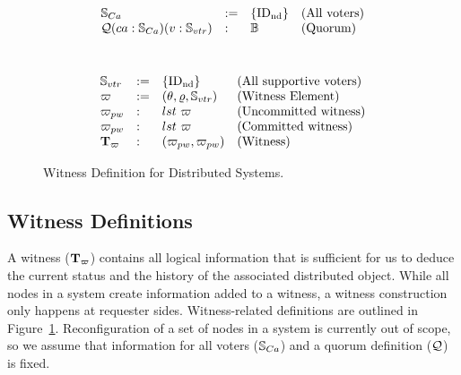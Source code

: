 \begin{figure}
\raggedright
\noindent{}  \\
$$
\begin{array}{llll}
\mathbb{S}_{Ca} & := & \{\mathrm{ID_{nd}}\} & \mbox{(All voters)}\\
\mathcal{Q} (ca: \mathbb{S}_{Ca}) (v: \mathbb{S}_{vtr}) &:& \mathbb{B} & \mbox{(Quorum)} \\
\end{array}
$$
\raggedright
\noindent{}  \\
$$
\begin{array}{llll}
\mathbb{S}_{vtr} & := & \{\mathrm{ID_{nd}}\} & \mbox{(All supportive voters)}\\
\varpi & :=  & ( \theta, \varrho, \mathbb{S}_{vtr}) & \mbox{(Witness Element)}\\
{\varpi_{pw}} &: & lst \ \varpi   & \mbox{(Uncommitted witness)}\\
{\varpi_{pw}} &: & lst \ \varpi   & \mbox{(Committed witness)}\\
{\textbf{T}_{\varpi}} &: &  ({\varpi_{pw}} , {\varpi_{pw}}) & \mbox{(Witness)}\\
\end{array}
$$
\caption{Witness Definition for Distributed Systems.}
\label{fig:chapter:witnesspassing:witness-definition}
\end{figure}

\subsection{Witness Definitions} 
\label{chapte:witnesspassing:subsec:witness-definition}

A witness (${\textbf{T}_{\varpi}}$) contains all logical information that is sufficient for us to deduce the current status and the history of the associated distributed object. 
While all nodes in a system create information added to a witness, a witness construction only
happens at requester sides. Witness-related definitions are outlined in
Figure~\ref{fig:chapter:witnesspassing:witness-definition}.
Reconfiguration of a set of nodes in a system is currently out of scope, so we assume that information for all voters ($\mathbb{S}_{Ca}$) and a quorum definition ($\mathcal{Q}$) is fixed.

